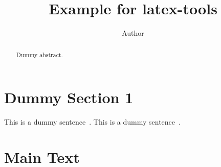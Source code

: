 \documentclass[twocolumn]{article}
\title{Example for latex-tools}
\author{Author}
\begin{document}
\maketitle



\begin{abstract}
Dummy abstract.
\end{abstract}
 


\section{Dummy Section 1}
\label{sec:dummy1}

This is a dummy sentence~\cite{Authors14}. This is a dummy sentence~\cite{Authors14b}.
 \section{Main Text}
\label{sec:main}
\end{document}
